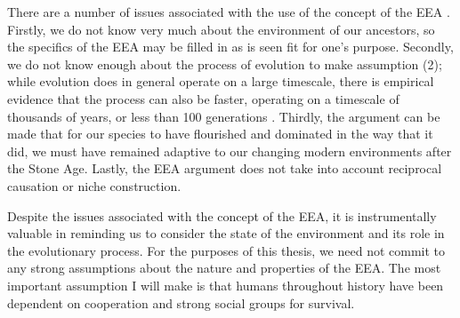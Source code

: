 There are a number of issues associated with the use of the concept of the EEA \citep{LB02}. Firstly, we do not know very much about the environment of our ancestors, so the specifics of the EEA may be filled in as is seen fit for one's purpose. Secondly, we do not know enough about the process of evolution to make assumption (2); while evolution does in general operate on a large timescale, there is empirical evidence
that the process can also be faster, operating on a timescale of thousands of years, or less than 100 generations \citep[pp.~190--191 and references therein]{LB02}. Thirdly, the argument can be made that for our species to have flourished and dominated in the way that it did, we must have remained adaptive to our changing modern environments after the Stone Age. Lastly, the EEA argument does not take into account reciprocal causation or niche construction.

Despite the issues associated with the concept of the EEA, it is instrumentally valuable in reminding us to consider the state of the environment and its role in the evolutionary process. For the purposes of this thesis, we need not commit to any strong assumptions about the nature and properties of the EEA. The most important assumption I will make is that humans throughout history have been dependent on cooperation and strong social groups for survival.

